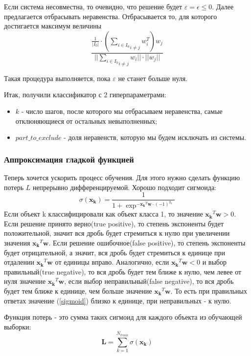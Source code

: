 \documentclass[a4paper]{article}
\newcommand{\w}{\bm{w}}
\newcommand{\yk}{y_k}
\newcommand{\xk}{\bm{x_k}}
\begin{document}
Если система несовместна, то очевидно, что решение будет $\varepsilon = \epsilon \le 0$. Далее предлагается отбрасывать неравенства. Отбрасывается то, для которого достигается максимум величины $$\frac{\frac{1}{|I_0|} \cdot (\underset{i \neq j}{\underset{i \in I_0}{\sum}}w_i^T)w_j}{||\underset{i \neq j}{\underset{i \in I_0}{\sum}}w_i||\cdot ||w_j|| }$$

Такая процедура выполняется, пока $\varepsilon$ не станет больше нуля.

Итак, получили классификатор с 2 гиперпараметрами:
\begin{itemize}
\item $k$ - число шагов, после которого мы отбрасываем неравенства, самые отклюняющиеся от остальных невыполненных;
\item $part\_to\_exclude$ - доля неравенств, которую мы будем исключать из системы.
\end{itemize}

\subsubsection{Аппроксимация гладкой функцией}

Теперь хочется ускорить процесс обучения. Для этого нужно сделать функцию потерь $L$ непрерывно дифференцируемой. Хорошо подходит сигмоида:
\begin{equation} \label{sigmoid}
\sigma(\xk) = \frac{1}{1 + \exp^{ - \xk^T\w \cdot (-1)^{\yk}}}
\end{equation}
Если объект k классифицировали как объект класса 1, то значение $\xk^T\w > 0$. Если решение принято верно(true positive), то степень экспоненты будет положительной, значит вся дробь будет стремиться к нулю при увеличении значения $\xk^T\w$. Если решение ошибочное(false positive), то степень экспоненты будет отрицательной, а значит, вся дробь будет стремиться к единице при отдалении $\xk^T\w$ от единицы вправо. Аналогично, если $\xk^T\w < 0$ и выбор правильный(true negative), то вся дробь будет тем ближе к нулю, чем левее от нуля значение $\xk^T\w$, если выбор неправильный(false negative), то вся дробь будет тем ближе к единице, чем больше значение $\xk^T\w$. То есть при правильных ответах значение (\ref{sigmoid}) близко к единице, при неправильных - к нулю.

Функция потерь - это сумма таких сигмоид для каждого объекта из обучающей выборки:
\begin{equation}
\bm{L} = \sum_{k = 1}^{N_{train}}\sigma(\xk)
\end{equation}
\end{document}
